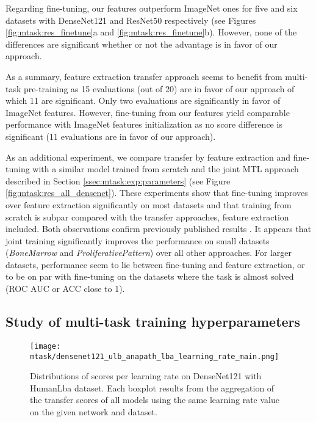 Regarding fine-tuning, our features outperform ImageNet ones for five and six datasets with DenseNet121 and ResNet50 respectively (see Figures \ref{fig:mtask:res_finetune}a and \ref{fig:mtask:res_finetune}b). However, none of the differences are significant whether or not the advantage is in favor of our approach.

As a summary, feature extraction transfer approach seems to benefit from multi-task pre-training as 15 evaluations (out of 20) are in favor of our approach of which 11 are significant. Only two evaluations are significantly in favor of ImageNet features.  However, fine-tuning from our features yield comparable performance with ImageNet features initialization as no score difference is significant (11 evaluations are in favor of our approach).


As an additional experiment, we compare transfer by feature extraction and fine-tuning with a similar model trained from scratch and the joint MTL approach described in Section \ref{ssec:mtask:exp:parameters} (see Figure \ref{fig:mtask:res_all_densenet}). These experiments show that fine-tuning improves over feature extraction significantly on most datasets and that training from scratch is subpar compared with the transfer approaches, feature extraction included. Both observations confirm previously published results \parencite{mormont2018comparison, ponzio2019dealing, tajbakhsh2016convolutional,shin2016deep}. It appears that joint training significantly improves the performance on small datasets (\textit{BoneMarrow} and \textit{ProliferativePattern}) over all other approaches. For larger datasets, performance seem to lie between fine-tuning and feature extraction, or to be on par with fine-tuning on the datasets where the task is almost solved (ROC AUC or ACC close to 1). 

\subsection{Study of multi-task training hyperparameters}
\label{ssec:mtask:hyperparameters}

\begin{figure}[t]
    \centering
    \texttt{[image: mtask/densenet121\_ulb\_anapath\_lba\_learning\_rate\_main.png]}
    \caption{Distributions of scores per learning rate on DenseNet121 with HumanLba dataset. Each boxplot results from the aggregation of the transfer scores of all models using the same learning rate value on the given network and dataset.}
    \label{fig:mtask:lr_effect}
\end{figure}

